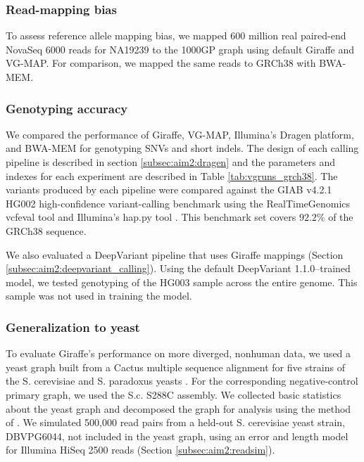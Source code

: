 \documentclass[11pt]{ucscthesis}
\begin{document}
\subsubsection{Read-mapping bias}
To assess reference allele mapping bias, we mapped 600 million real paired-end NovaSeq 6000 reads for NA19239 to the 1000GP graph using default Giraffe and VG-MAP.
For comparison, we mapped the same reads to GRCh38 with BWA-MEM.

\subsubsection{Genotyping accuracy}
\label{subsec:aim2:genotyping-accuracy-methods}
We compared the performance of Giraffe, VG-MAP, Illumina’s Dragen platform, and BWA-MEM for genotyping SNVs and short indels.
The design of each calling pipeline is described in section \ref{subsec:aim2:dragen} and the parameters and indexes for each experiment are described in Table \ref{tab:vgruns_grch38}.
The variants produced by each pipeline were compared against the GIAB v4.2.1 HG002 high-confidence variant-calling benchmark \cite{wagner_benchmarking_2020} using the RealTimeGenomics vcfeval tool \cite{cleary2015comparing} and Illumina’s hap.py tool \cite{happy_2020}.
This benchmark set covers $92.2\%$ of the GRCh38 sequence.

We also evaluated a DeepVariant \cite{poplin_universal_2018} pipeline that uses Giraffe mappings (Section \ref{subsec:aim2:deepvariant_calling}).
Using the default DeepVariant 1.1.0–trained model, we tested genotyping of the HG003 sample across the entire genome.
This sample was not used in training the model.

\subsubsection{Generalization to yeast}
\label{subsec:aim2:yeast-methods}
To evaluate Giraffe’s performance on more diverged, nonhuman data, we used a yeast graph built from a Cactus multiple sequence alignment for five strains of the S. cerevisiae and S. paradoxus yeasts \cite{hickey_vgsv_2020}.
For the corresponding negative-control primary graph, we used the S.c. S288C assembly.
We collected basic statistics about the yeast graph and decomposed the graph for analysis using the method of \cite{paten_superbubbles_2018}.
We simulated 500,000 read pairs from a held-out S. cerevisiae yeast strain, DBVPG6044, not included in the yeast graph, using an error and length model for Illumina HiSeq 2500 reads (Section \ref{subsec:aim2:readsim}).
\end{document}
